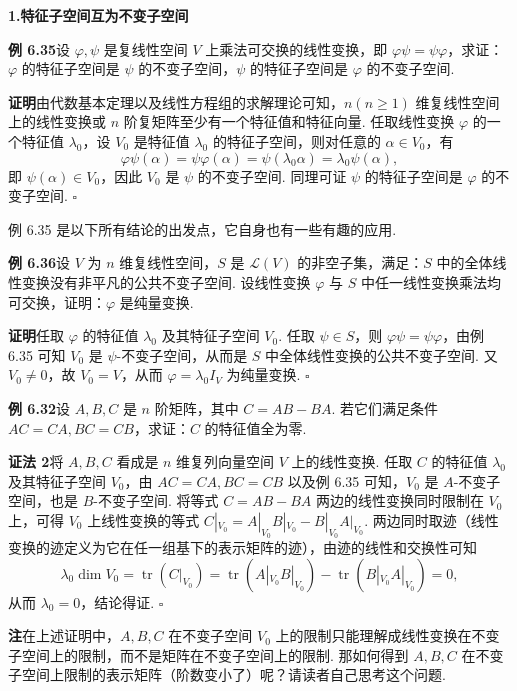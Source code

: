 \documentclass[UTF8, 12pt, fontset=fandol, oneside]{ctexart}
\begin{document}
\noindent\textbf{1.\quad 特征子空间互为不变子空间}

\noindent\textbf{例 6.35}\quad 设 $\varphi,\psi$ 是复线性空间 $V$ 上乘法可交换的线性变换，即 $\varphi\psi=\psi\varphi$，求证：$\varphi$ 的特征子空间是 $\psi$ 的不变子空间，$\psi$ 的特征子空间是 $\varphi$ 的不变子空间.

\noindent\textbf{证明}\quad 由代数基本定理以及线性方程组的求解理论可知，$n(n\ge 1)$ 维复线性空间上的线性变换或 $n$ 阶复矩阵至少有一个特征值和特征向量. 任取线性变换 $\varphi$ 的一个特征值 $\lambda_0$，设 $V_0$ 是特征值 $\lambda_0$ 的特征子空间，则对任意的 $\alpha\in V_0$，有
\[
\varphi\psi(\alpha)=\psi\varphi(\alpha)=\psi(\lambda_0\alpha)=\lambda_0\psi(\alpha),
\]
即 $\psi(\alpha)\in V_0$，因此 $V_0$ 是 $\psi$ 的不变子空间. 同理可证 $\psi$ 的特征子空间是 $\varphi$ 的不变子空间. $\square$

例 6.35 是以下所有结论的出发点，它自身也有一些有趣的应用.

\noindent\textbf{例 6.36}\quad 设 $V$ 为 $n$ 维复线性空间，$S$ 是 $\mathcal{L}(V)$ 的非空子集，满足：$S$ 中的全体线性变换没有非平凡的公共不变子空间. 设线性变换 $\varphi$ 与 $S$ 中任一线性变换乘法均可交换，证明：$\varphi$ 是纯量变换.

\noindent\textbf{证明}\quad 任取 $\varphi$ 的特征值 $\lambda_0$ 及其特征子空间 $V_0$. 任取 $\psi\in S$，则 $\varphi\psi=\psi\varphi$，由例 6.35 可知 $V_0$ 是 $\psi$-不变子空间，从而是 $S$ 中全体线性变换的公共不变子空间. 又 $V_0\ne 0$，故 $V_0=V$，从而 $\varphi=\lambda_0I_V$ 为纯量变换. $\square$

\noindent\textbf{例 6.32}\quad 设 $A,B,C$ 是 $n$ 阶矩阵，其中 $C=AB-BA$. 若它们满足条件 $AC=CA,BC=CB$，求证：$C$ 的特征值全为零.

\noindent\textbf{证法 2}\quad 将 $A,B,C$ 看成是 $n$ 维复列向量空间 $V$ 上的线性变换. 任取 $C$ 的特征值 $\lambda_0$ 及其特征子空间 $V_0$，由 $AC=CA,BC=CB$ 以及例 6.35 可知，$V_0$ 是 $A$-不变子空间，也是 $B$-不变子空间. 将等式 $C=AB-BA$ 两边的线性变换同时限制在 $V_0$ 上，可得 $V_0$ 上线性变换的等式 $C|_{V_0}=A|_{V_0}B|_{V_0}-B|_{V_0}A|_{V_0}$. 两边同时取迹（线性变换的迹定义为它在任一组基下的表示矩阵的迹），由迹的线性和交换性可知
\[
\lambda_0\dim V_0=\operatorname{tr}(C|_{V_0})
=\operatorname{tr}(A|_{V_0}B|_{V_0})-\operatorname{tr}(B|_{V_0}A|_{V_0})=0,
\]
从而 $\lambda_0=0$，结论得证. $\square$

\noindent\textbf{注}\quad 在上述证明中，$A,B,C$ 在不变子空间 $V_0$ 上的限制只能理解成线性变换在不变子空间上的限制，而不是矩阵在不变子空间上的限制. 那如何得到 $A,B,C$ 在不变子空间上限制的表示矩阵（阶数变小了）呢？请读者自己思考这个问题.
\end{document}
